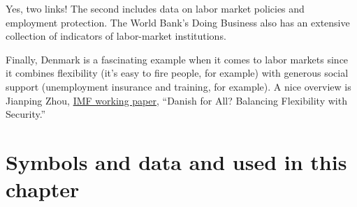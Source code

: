 Yes, two links!  The second includes data
on labor market policies and employment protection.
The World Bank's Doing Business also has an extensive collection of
{indicators} of labor-market institutions.

Finally, Denmark is a fascinating example when it comes to labor markets
since it combines flexibility (it's easy to fire people, for example)
with generous social support (unemployment insurance
and training, for example).
A nice overview is
Jianping Zhou,
\href{http://www.imf.org/external/pubs/ft/wp/2007/wp0736.pdf}
{IMF working paper},
``Danish for All? Balancing Flexibility with Security.''

{}
\section*{Symbols and data and used in this chapter}

